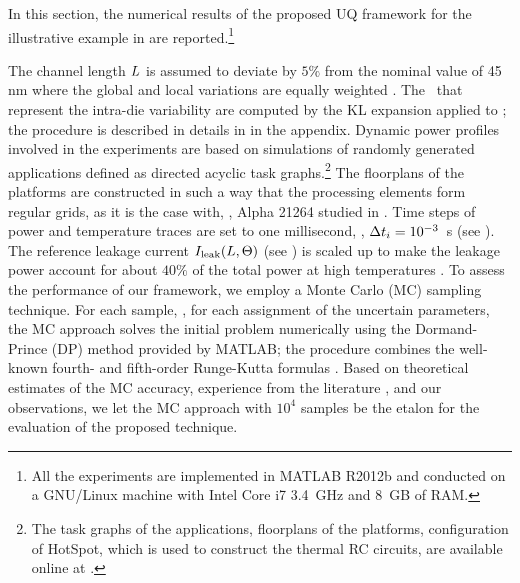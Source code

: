 In this section, the numerical results of the proposed UQ framework for the illustrative example in  are reported.\footnote{All the experiments are implemented in MATLAB R2012b \cite{matlab} and conducted on a GNU/Linux machine with Intel Core i7 3.4~GHz and 8~GB of RAM.}

The channel length $L$ is assumed to deviate by $5\%$ from the nominal value of 45 nm where the global and local variations are equally weighted \cite{juan2011, juan2012}. The \rvs\ that represent the intra-die variability are computed by the KL expansion applied to ; the procedure is described in details in  in the appendix. Dynamic power profiles involved in the experiments are based on simulations of randomly generated applications defined as directed acyclic task graphs.\footnote{The task graphs of the applications, floorplans of the platforms, configuration of HotSpot, which is used to construct the thermal RC circuits, are available online at \cite{sources}.} The floorplans of the platforms are constructed in such a way that the processing elements form regular grids, as it is the case with, \eg, Alpha 21264 studied in \cite{juan2011}. Time steps of power and temperature traces are set to one millisecond, \ie, $\Delta t_i = 10^{-3}$~s (see ). The reference leakage current $I_{\text{leak}}(L, \Theta)$ (see ) is scaled up to make the leakage power account for about $40\%$ of the total power at high temperatures \cite{liu2007}. To assess the performance of our framework, we employ a Monte Carlo (MC) sampling technique. For each sample, \ie, for each assignment of the uncertain parameters, the MC approach solves the initial problem numerically using the Dormand-Prince (DP) method provided by MATLAB; the procedure combines the well-known fourth- and fifth-order Runge-Kutta formulas \cite{press2007}. Based on theoretical estimates \cite{diaz-emparanza2002} of the MC accuracy, experience from the literature \cite{xiu2010, eldred2009, maitre2010, shen2009}, and our observations, we let the MC approach with $10^4$ samples be the etalon for the evaluation of the proposed technique.

